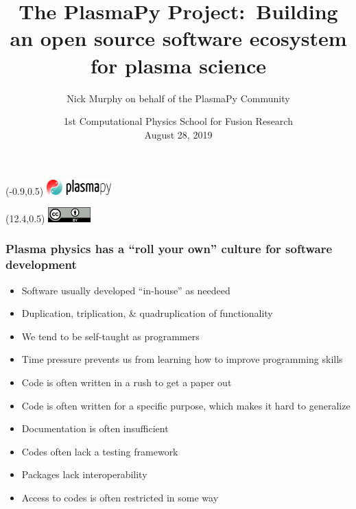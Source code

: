 \documentclass[default,compress]{beamer}
\title{The PlasmaPy Project:\ Building an open source software ecosystem for plasma science}
\author{Nick Murphy\inst{1} on behalf of the PlasmaPy Community}
\institute{\inst{1}Center for Astrophysics $\vert$\ Harvard \& Smithsonian}
\date{\small{
1st Computational Physics School for Fusion Research\\
August 28, 2019}}
\begin{document}

\begin{frame}[plain]

    \titlepage

    \begin{textblock}{1}(-0.9,0.5)
      \href{http://www.plasmapy.org/}{\includegraphics[height=0.57cm]{plasmapy-logo.png}}
    \end{textblock}
    
    \begin{textblock}{1}(12.4,0.5)
      \href{https://creativecommons.org/licenses/by/4.0/}{\includegraphics[height=0.57cm]{by.png}}
    \end{textblock}
    
\end{frame}


\begin{frame}[plain]
    \frametitle{Plasma physics has a ``roll your own'' culture for software development}
    \begin{itemize}
    \item Software usually developed ``in-house'' as needeed
    \item Duplication, triplication, \& quadruplication of functionality
    \item We tend to be self-taught as programmers
    \item Time pressure prevents us from learning how to improve programming skills
    \item Code is often written in a rush to get a paper out
    \item Code is often written for a specific purpose, which makes it hard to generalize
    \item Documentation is often insufficient
    \item Codes often lack a testing framework
    \item Packages lack interoperability
    \item Access to codes is often restricted in some way
    \end{itemize}
\end{frame}
\end{document}
